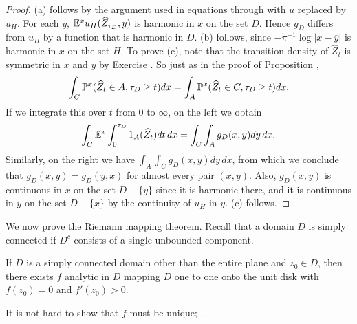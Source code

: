 \begin{proof}
(a) follows by the argument used in equations  through  with $u$ replaced by $u_H$. For each $y$, $\E^xu_H(\widehat{Z}_{\tau_D},y)$ is harmonic in $x$ on the set $D$. Hence $g_D$ differs from $u_H$ by a function that is harmonic in $D$. (b) follows, since $-\pi^{-1}\log|x-\overline{y}|$ is harmonic in $x$ on the set $H$. To prove (c), note that the transition density of $\widehat{Z}_t$ is symmetric in $x$ and $y$ by Exercise . So just as in the proof of Proposition ,
\[
    \int_C \P^x(\widehat{Z}_t \in A, \tau_D \geq t)dx = \int_A \P^x(\widehat{Z}_t \in C, \tau_D \geq t)dx.
\]
If we integrate this over $t$ from $0$ to $\infty$, on the left we obtain
\[
    \int_C \E^x\int_0^{\tau_D} 1_A(\widehat{Z}_t)dt\, dx = \int_C\int_A g_D(x,y)dy\, dx.
\]
Similarly, on the right we have $\int_A\int_C g_D(x,y)dy\, dx$, from which we con\-clude that $g_D(x,y) = g_D(y,x)$ for almost every pair $(x,y)$. Also, $g_D(x,y)$ is continuous in $x$ on the set $D-\{y\}$ since it is harmonic there, and it is continuous in $y$ on the set $D-\{x\}$ by the continuity of $u_H$ in $y$. (c) follows.
\end{proof}


We now prove the Riemann mapping theorem. Recall that a domain $D$ is simply connected if $D^c$ consists of a single unbounded component.

\begin{theorem}\label{thm:ch5_1.14}
If $D$ is a simply connected domain other than the entire plane and $z_0 \in D$, then there exists $f$ analytic in $D$ mapping $D$ one to one onto the unit disk with $f(z_0) = 0$ and $f'(z_0) > 0$.
\end{theorem}

It is not hard to show that $f$ must be unique; \cite[see][p.~222]{Ahlfors1979}.


